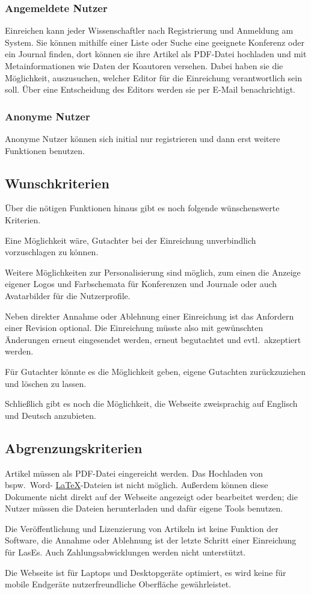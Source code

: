 \subsubsection{Angemeldete Nutzer}
Einreichen kann jeder Wissenschaftler nach Registrierung und Anmeldung am System.
Sie können mithilfe einer Liste oder Suche eine geeignete Konferenz oder ein Journal finden,
dort können sie ihre Artikel als PDF-Datei hochladen und mit Metainformationen wie Daten der Koautoren versehen.
Dabei haben sie die Möglichkeit, auszusuchen, welcher Editor für die Einreichung verantwortlich sein soll.
Über eine Entscheidung des Editors werden sie per E-Mail benachrichtigt.

\subsubsection{Anonyme Nutzer}
Anonyme Nutzer können sich initial nur registrieren und dann erst weitere Funktionen benutzen.


\subsection{Wunschkriterien}

Über die nötigen Funktionen hinaus gibt es noch folgende wünschenswerte Kriterien.

Eine Möglichkeit wäre, Gutachter bei der Einreichung unverbindlich vorzuschlagen zu können.

Weitere Möglichkeiten zur Personalisierung sind möglich,
zum einen die Anzeige eigener Logos und Farbschemata für Konferenzen und Journale oder auch Avatarbilder für die Nutzerprofile.

Neben direkter Annahme oder Ablehnung einer Einreichung ist das Anfordern einer Revision optional.
Die Einreichung müsste also mit gewünschten Änderungen erneut eingesendet werden, erneut begutachtet und evtl.\ akzeptiert werden.

Für Gutachter könnte es die Möglichkeit geben, eigene Gutachten zurückzuziehen und löschen zu lassen.

Schließlich gibt es noch die Möglichkeit, die Webseite zweisprachig auf Englisch und Deutsch anzubieten.

\subsection{Abgrenzungskriterien}

Artikel müssen als PDF-Datei eingereicht werden. Das Hochladen von bspw.\ Word- \hyperref[glo:latex]{\LaTeX}-Dateien ist nicht möglich.
Außerdem können diese Dokumente nicht direkt auf der Webseite angezeigt oder bearbeitet werden;
die Nutzer müssen die Dateien herunterladen und dafür eigene Tools benutzen.

Die Veröffentlichung und Lizenzierung von Artikeln ist keine Funktion der Software,
die Annahme oder Ablehnung ist der letzte Schritt einer Einreichung für LasEs.
Auch Zahlungsabwicklungen werden nicht unterstützt.

Die Webseite ist für Laptops und Desktopgeräte optimiert, es wird keine für mobile Endgeräte nutzerfreundliche Oberfläche gewährleistet.
